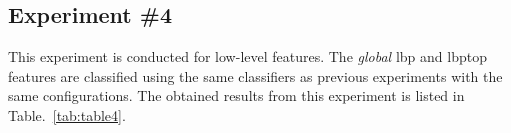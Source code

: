 


\subsection{Experiment \#4}\label{subsec:exp4}
This experiment is conducted for low-level features.
The \emph{global} \ac{lbp} and \ac{lbptop} features are classified using the same classifiers as previous experiments with the same configurations.
The obtained results from this experiment is listed in Table.~\ref{tab:table4}.\\






